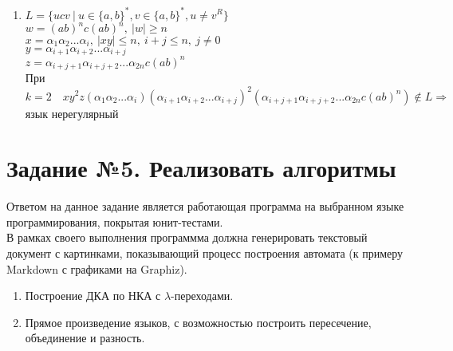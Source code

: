 \documentclass[a4paper, 12pt]{article}
\begin{document}
\begin{enumerate}
    \item $L=\{ucv \ | \ u \in \{a,b\}^*, v \in \{a,b\}^*, u\neq v^R  \}$
    \\
    $w = (ab)^nc(ab)^n, \ |w| \geq n$\\
    $x = \alpha_1\alpha_2...\alpha_i, \ |xy| \leq n, \  i+j \leq n, \ j \neq 0 $ \\
    $y = \alpha_{i+1}\alpha_{i+2}...\alpha_{i+j}$ \\
    $z = \alpha_{i+j+1}\alpha_{i+j+2}...\alpha_{2n} c(ab)^n$\\
    При $k = 2 \quad  xy^2z(\alpha_1\alpha_2...\alpha_i)(\alpha_{i+1}\alpha_{i+2}...\alpha_{i+j})^2(\alpha_{i+j+1}\alpha_{i+j+2}...\alpha_{2n} c (ab)^n) \notin L \Rightarrow $ язык нерегулярный\\
    
\end{enumerate}


\section{Задание №5. Реализовать алгоритмы}
Ответом на данное задание является работающая программа на выбранном языке программирования, покрытая юнит-тестами. \\

В рамках своего выполнения программма должна генерировать текстовый документ с картинками, показывающий процесс построения автомата (к примеру Markdown с графиками на Graphiz).\\
\begin{enumerate}
    \item Построение ДКА по НКА с 
    $\lambda$-переходами.
    \item Прямое произведение языков, с возможностью построить пересечение, объединение и разность.
\end{enumerate}
\end{document}
